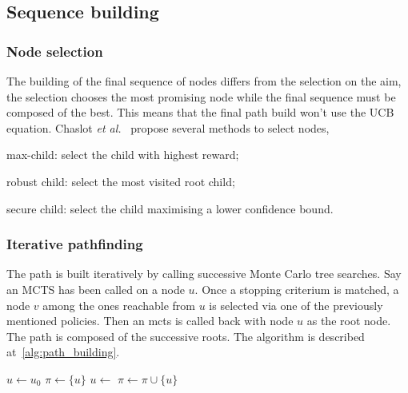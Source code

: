 \documentclass[oneside,twocolumn]{article}
\DeclareMathOperator{\argmax}{argmax}
\begin{document}
\subsection{Sequence building}
\subsubsection{Node selection}\label{sssec:node_selection}
The building of the final sequence of nodes differs from the selection on the
aim, the selection chooses the most promising node while the final sequence
must be composed of the best. This means that the final path build won't use the
UCB equation. Chaslot \textit{et al.}~\cite{browne2012survey} propose several
methods to select nodes,
\begin{compactitem}
  \item max-child: select the child with highest reward;
  \item robust child: select the most visited root child;
  \item secure child: select the child maximising a lower confidence bound.
\end{compactitem}

\subsubsection{Iterative pathfinding}
The path is built iteratively by calling successive Monte Carlo tree searches.
Say an MCTS has been called on a node \(u\). Once a stopping criterium is
matched, a node \(v\) among the ones reachable from \(u\) is selected via one of
the previously mentioned policies. Then an mcts is called back with node \(u\)
as the root node. The path is composed of the successive roots. The algorithm is
described at~\ref{alg:path_building}.
\begin{algorithm}
  \caption{%
    Path building. The {\sc NextNode} (here max-child) function is one among
    those in~\ref{sssec:node_selection}.
  }\label{alg:path_building}
  \begin{algorithmic}
    \State{}\(u \gets u_0\)
    \State{}\(\pi \gets \{u\}\)
      \State{}
      \State{}\(u \gets\)
      \State{}\(\pi \gets \pi \cup \{u\}\)
    \EndFor{}
    \State{}\Return{$\pi$}
    \EndFunction{}
    \State{}\Return{$\argmax\{\mu_v | v \text{\,children of\,} u\}$}
    \EndFunction{}
  \end{algorithmic}
\end{algorithm}
\end{document}
